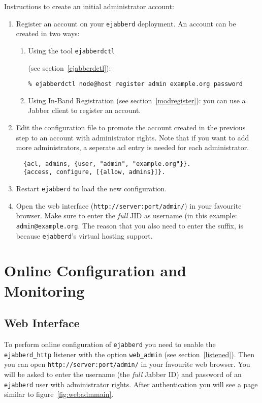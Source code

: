 \documentclass[a4paper,10pt]{article}
\newcommand{\ind}[1]{\begin{latexonly}\index{#1}\end{latexonly}}
\newcommand{\jid}[1]{\texttt{#1}}
\newcommand{\term}[1]{\texttt{#1}}
\newcommand{\ejabberd}{\texttt{ejabberd}}
\newcommand{\Jabber}{Jabber}
\begin{document}
Instructions to create an initial administrator account:
\begin{enumerate}
\item Register an account on your \ejabberd{} deployment. An account can be
  created in two ways:
  \begin{enumerate}
  \item Using the tool \term{ejabberdctl}\ind{ejabberdctl} (see
    section~\ref{ejabberdctl}):
    \begin{verbatim}
% ejabberdctl node@host register admin example.org password
\end{verbatim} 
  \item Using In-Band Registration (see section~\ref{modregister}): you can
    use a \Jabber{} client to register an account.
  \end{enumerate}
\item Edit the configuration file to promote the account created in the previous
  step to an account with administrator rights. Note that if you want to add
  more administrators, a seperate acl entry is needed for each administrator.
  \begin{verbatim}
  {acl, admins, {user, "admin", "example.org"}}.
  {access, configure, [{allow, admins}]}.
\end{verbatim} 
\item Restart \ejabberd{} to load the new configuration.
\item Open the web interface (\verb|http://server:port/admin/|) in your
  favourite browser. Make sure to enter the \emph{full} JID as username (in this
  example: \jid{admin@example.org}. The reason that you also need to enter the
  suffix, is because \ejabberd{}'s virtual hosting support.
\end{enumerate}


\section{Online Configuration and Monitoring}
\label{onlineconfig}

\subsection{Web Interface}
\label{webinterface}
\ind{web interface}

To perform online configuration of \ejabberd{} you need to enable the
\term{ejabberd\_http} listener with the option \term{web\_admin} (see
section~\ref{listened}). Then you can open 
\verb|http://server:port/admin/| in your favourite web browser. You
will be asked to enter the username (the \emph{full} \Jabber{} ID) and password
of an \ejabberd{} user with administrator rights. After authentication
you will see a page similar to figure~\ref{fig:webadmmain}.
\end{document}
